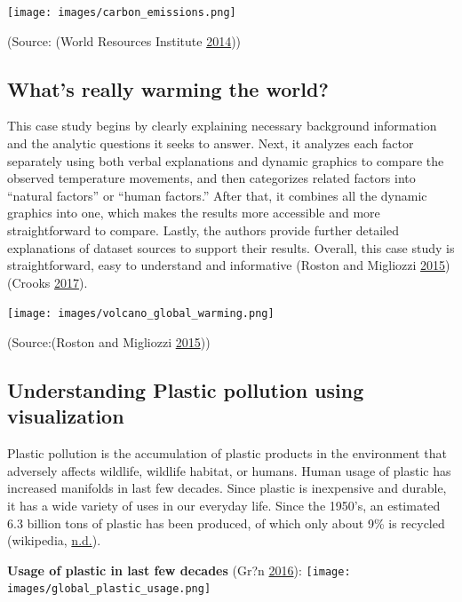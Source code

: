 \documentclass[]{book}
\begin{document}
\texttt{[image: images/carbon\_emissions.png]}

(Source: (World Resources Institute \protect\hyperlink{ref-CO2_emission}{2014}))

\hypertarget{whats-really-warming-the-world}{%
\subsection{What's really warming the world?}\label{whats-really-warming-the-world}}

This case study begins by clearly explaining necessary background information and the analytic questions it seeks to answer. Next, it analyzes each factor separately using both verbal explanations and dynamic graphics to compare the observed temperature movements, and then categorizes related factors into ``natural factors'' or ``human factors.'' After that, it combines all the dynamic graphics into one, which makes the results more accessible and more straightforward to compare. Lastly, the authors provide further detailed explanations of dataset sources to support their results. Overall, this case study is straightforward, easy to understand and informative (Roston and Migliozzi \protect\hyperlink{ref-world_warming}{2015}) (Crooks \protect\hyperlink{ref-int_viz_capt}{2017}).

\texttt{[image: images/volcano\_global\_warming.png]}

(Source:(Roston and Migliozzi \protect\hyperlink{ref-world_warming}{2015}))

\hypertarget{understanding-plastic-pollution-using-visualization}{%
\subsection{Understanding Plastic pollution using visualization}\label{understanding-plastic-pollution-using-visualization}}

Plastic pollution is the accumulation of plastic products in the environment that adversely affects wildlife, wildlife habitat, or humans. Human usage of plastic has increased manifolds in last few decades. Since plastic is inexpensive and durable, it has a wide variety of uses in our everyday life. Since the 1950's, an estimated 6.3 billion tons of plastic has been produced, of which only about 9\% is recycled (wikipedia, \protect\hyperlink{ref-wiki_plastic_pollution}{n.d.}).

\textbf{Usage of plastic in last few decades} (Gr?n \protect\hyperlink{ref-plastic_pollution_visualizations}{2016}):
\texttt{[image: images/global\_plastic\_usage.png]}
\end{document}

